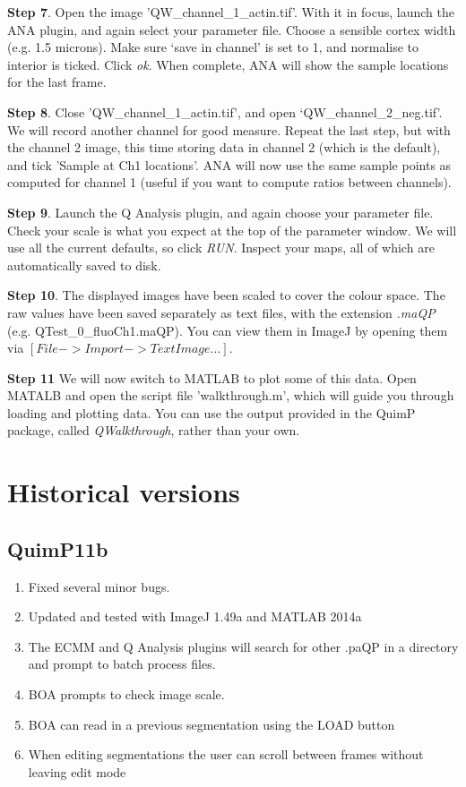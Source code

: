 \documentclass[a4paper,12pt]{article}
\begin{document}
\textbf{Step 7}. Open the image 'QW\_channel\_1\_actin.tif'.  With it in focus, launch the ANA plugin,
and again select your parameter file.  Choose a sensible cortex width (e.g. 1.5 microns).
Make sure `save in channel' is set to 1, and normalise to interior is ticked.  Click \emph{ok}.
When complete, ANA will show the sample locations for the last frame.

\textbf{Step 8}. Close 'QW\_channel\_1\_actin.tif', and open `QW\_channel\_2\_neg.tif'.  We will record another
channel for good measure.  Repeat the last step, but with the channel 2 image, this time storing
data in channel 2 (which is the default), and tick 'Sample at Ch1 locations'.  ANA will now
use the same sample points as computed for channel 1 (useful if you want to compute ratios between channels).

\textbf{Step 9}. Launch the Q Analysis plugin, and again choose your parameter file. Check your scale is what you expect at the top of the parameter window. We will use all the
current defaults, so click \emph{RUN}.  Inspect your maps, all of which are automatically saved to disk.

\textbf{Step 10}. The displayed images have been scaled to cover the colour space. The raw values have been saved
separately as text files, with the extension \emph{.maQP} (e.g.  QTest\_0\_fluoCh1.maQP).
You can view them in ImageJ by opening them via $[File -> Import -> Text Image...]$.

\textbf{Step 11} We will now switch to MATLAB to plot some of this data.  Open MATALB
and open the script file 'walkthrough.m', which will guide you through loading and plotting data.
You can use the output provided in the QuimP package, called \textit{QWalkthrough}, rather than
your own.

\section {Historical versions}

\subsection{QuimP11b}

\begin{enumerate}
	\item Fixed several minor bugs.
	\item Updated and tested with ImageJ 1.49a and MATLAB 2014a
	\item The ECMM and Q Analysis plugins will search for other .paQP in a directory and prompt to batch process files.
	\item BOA prompts to check image scale.
	\item BOA can read in a previous segmentation using the LOAD button
	\item When editing segmentations the user can scroll between frames without leaving edit mode
\end{enumerate}
\end{document}
